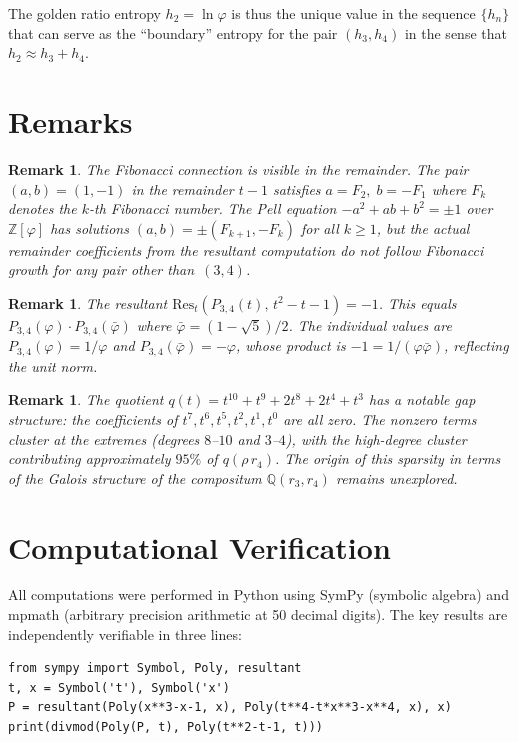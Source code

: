 \documentclass[12pt]{article}
\newtheorem{remark}[theorem]{Remark}
\newcommand{\Z}{\mathbb{Z}}
\newcommand{\Q}{\mathbb{Q}}
\begin{document}
The golden ratio entropy $h_2 = \ln\varphi$ is thus the unique
value in the sequence $\{h_n\}$ that can serve as the ``boundary''
entropy for the pair $(h_3, h_4)$ in the sense that
$h_2 \approx h_3 + h_4$.


\section{Remarks}

\begin{remark}
The Fibonacci connection is visible in the remainder.
The pair $(a, b) = (1, -1)$ in the remainder $t - 1$
satisfies $a = F_2,\; b = -F_1$ where $F_k$ denotes
the $k$-th Fibonacci number. The Pell equation
$-a^2 + ab + b^2 = \pm 1$ over $\Z[\varphi]$ has solutions
$(a,b) = \pm(F_{k+1}, -F_k)$ for all $k \geq 1$, but the
actual remainder coefficients from the resultant computation
do not follow Fibonacci growth for any pair other than~$(3,4)$.
\end{remark}

\begin{remark}
The resultant $\mathrm{Res}_t(P_{3,4}(t),\, t^2 - t - 1) = -1$.
This equals $P_{3,4}(\varphi) \cdot P_{3,4}(\bar\varphi)$
where $\bar\varphi = (1-\sqrt5)/2$. The individual values
are $P_{3,4}(\varphi) = 1/\varphi$ and
$P_{3,4}(\bar\varphi) = -\varphi$, whose product is
$-1 = 1/(\varphi\bar\varphi)$, reflecting the unit norm.
\end{remark}

\begin{remark}
The quotient $q(t) = t^{10} + t^9 + 2t^8 + 2t^4 + t^3$
has a notable gap structure: the coefficients of
$t^7, t^6, t^5, t^2, t^1, t^0$ are all zero. The nonzero
terms cluster at the extremes (degrees $8$--$10$ and $3$--$4$),
with the high-degree cluster contributing approximately
$95\%$ of $q(\rho\,r_4)$. The origin of this sparsity in
terms of the Galois structure of the compositum
$\Q(r_3, r_4)$ remains unexplored.
\end{remark}


\section{Computational Verification}

All computations were performed in Python using SymPy
(symbolic algebra) and mpmath (arbitrary precision arithmetic
at 50 decimal digits). The key results are independently
verifiable in three lines:

\begin{verbatim}
from sympy import Symbol, Poly, resultant
t, x = Symbol('t'), Symbol('x')
P = resultant(Poly(x**3-x-1, x), Poly(t**4-t*x**3-x**4, x), x)
print(divmod(Poly(P, t), Poly(t**2-t-1, t)))
\end{verbatim}
\end{document}
